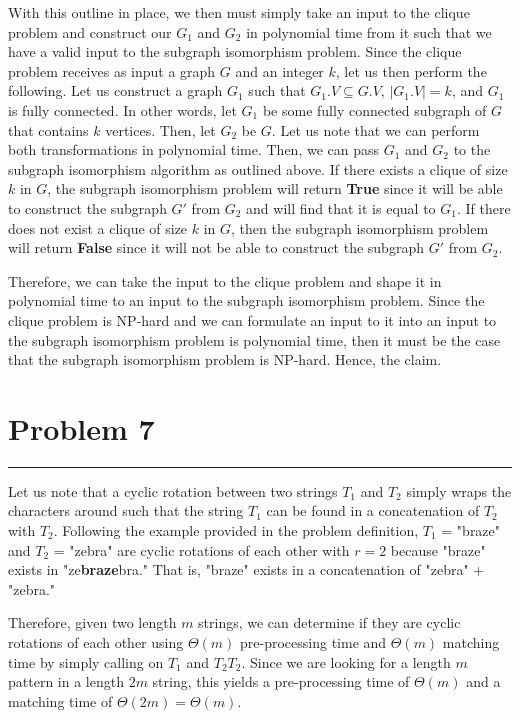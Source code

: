 \documentclass[11pt]{article}
\def\separateline{\medskip\hrule\medskip}
\begin{document}
With this outline in place, we then must simply take an input to the clique problem and construct our $G_1$ and $G_2$ in polynomial time from it such that we have a valid input to the subgraph isomorphism problem. Since the clique problem receives as input a graph $G$ and an integer $k$, let us then perform the following. Let us construct a graph $G_1$ such that $G_1.V \subseteq G.V$, $|G_1.V| = k$, and $G_1$ is fully connected. In other words, let $G_1$ be some fully connected subgraph of $G$ that contains $k$ vertices. Then, let $G_2$ be $G$. Let us note that we can perform both transformations in polynomial time. Then, we can pass $G_1$ and $G_2$ to the subgraph isomorphism algorithm as outlined above. If there exists a clique of size $k$ in $G$, the subgraph isomorphism problem will return \textbf{True} since it will be able to construct the subgraph $G'$ from $G_2$ and will find that it is equal to $G_1$. If there does not exist a clique of size $k$ in $G$, then the subgraph isomorphism problem will return \textbf{False} since it will not be able to construct the subgraph $G'$ from $G_2$.

Therefore, we can take the input to the clique problem and shape it in polynomial time to an input to the subgraph isomorphism problem. Since the clique problem is NP-hard and we can formulate an input to it into an input to the subgraph isomorphism problem is polynomial time, then it must be the case that the subgraph isomorphism problem is NP-hard. Hence, the claim.

\newpage

\section{Problem 7}
\separateline

Let us note that a cyclic rotation between two strings $T_1$ and $T_2$ simply wraps the characters around such that the string $T_1$ can be found in a concatenation of $T_2$ with $T_2$. Following the example provided in the problem definition, $T_1$ = "braze" and $T_2$ = "zebra" are cyclic rotations of each other with $r = 2$ because "braze" exists in "ze\textbf{braze}bra." That is, "braze" exists in a concatenation of "zebra" + "zebra."

Therefore, given two length $m$ strings, we can determine if they are cyclic rotations of each other using $\Theta(m)$ pre-processing time and $\Theta(m)$ matching time
by simply calling  on $T_1$ and $T_2T_2$. Since we are looking for a length $m$ pattern in a length $2m$ string, this yields a pre-processing time of $\Theta(m)$ and a matching time of $\Theta(2m) = \Theta(m)$.
\end{document}
